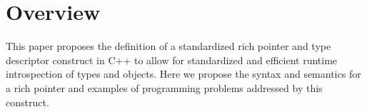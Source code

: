 \section{Overview}

This paper proposes the definition of a standardized rich pointer and type
descriptor construct in C++ to allow for standardized and efficient runtime
introspection of types and objects. Here we propose the syntax and semantics for
a rich pointer and examples of programming problems addressed by this construct.


